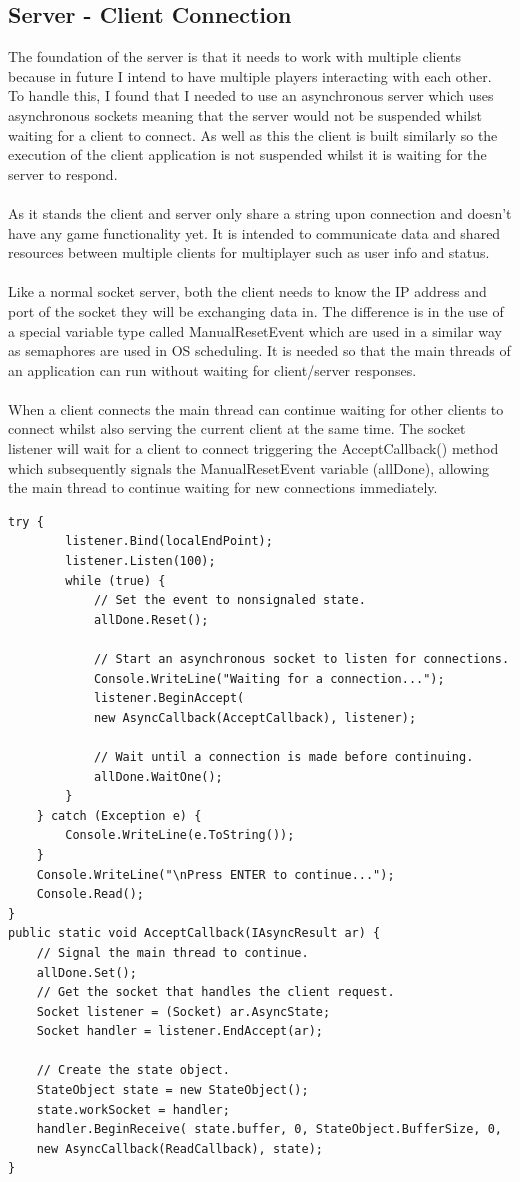 \documentclass[a4paper]{report}
\begin{document}
\subsection{Server - Client Connection}
The foundation of the server is that it needs to work with multiple clients because in future I intend to have multiple players interacting with each other. To handle this, I found that I needed to use an asynchronous server which uses asynchronous sockets meaning that the server would not be suspended whilst waiting for a client to connect. As well as this the client is built similarly so the execution of the client application is not suspended whilst it is waiting for the server to respond.
\\\\
As it stands the client and server only share a string upon connection and doesn’t have any game functionality yet. It is intended to communicate data and shared resources between multiple clients for multiplayer such as user info and status.
\\\\
Like a normal socket server, both the client needs to know the IP address and port of the socket they will be exchanging data in. The difference is in the use of a special variable type called ManualResetEvent which are used in a similar way as semaphores are used in OS scheduling. It is needed so that the main threads of an application can run without waiting for client/server responses. \cite{MRE}
\\\\
When a client connects the main thread can continue waiting for other clients to connect whilst also serving the current client at the same time. The socket listener will wait for a client to connect triggering the AcceptCallback() method which subsequently signals the ManualResetEvent variable (allDone), allowing the main thread to continue waiting for new connections immediately. \cite{Server} 

\begin{Verbatim}[tabsize=4]
	try {
		listener.Bind(localEndPoint);
		listener.Listen(100);
		while (true) {
			// Set the event to nonsignaled state.
			allDone.Reset();
			
			// Start an asynchronous socket to listen for connections.
			Console.WriteLine("Waiting for a connection...");
			listener.BeginAccept( 
			new AsyncCallback(AcceptCallback), listener);
			
			// Wait until a connection is made before continuing.
			allDone.WaitOne();
		}
	} catch (Exception e) {
		Console.WriteLine(e.ToString());
	}
	Console.WriteLine("\nPress ENTER to continue...");
	Console.Read();
}
public static void AcceptCallback(IAsyncResult ar) {
	// Signal the main thread to continue.
	allDone.Set();	
	// Get the socket that handles the client request.
	Socket listener = (Socket) ar.AsyncState;
	Socket handler = listener.EndAccept(ar);
	
	// Create the state object.
	StateObject state = new StateObject();
	state.workSocket = handler;
	handler.BeginReceive( state.buffer, 0, StateObject.BufferSize, 0,
	new AsyncCallback(ReadCallback), state);
}
\end{Verbatim}
\end{document}
